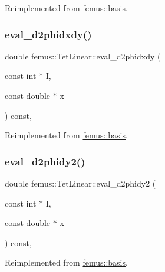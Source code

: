 Reimplemented from \mbox{\hyperlink{classfemus_1_1basis_a0a9839e75d1c9c8302486fc072eed028}{femus\+::basis}}.

\mbox{\label{classfemus_1_1_tet_linear_a45330406ce8b3f4ad0651e7ffda5dd82}} 
\subsubsection{\texorpdfstring{eval\+\_\+d2phidxdy()}{eval\_d2phidxdy()}}
{\footnotesize\ttfamily double femus\+::\+Tet\+Linear\+::eval\+\_\+d2phidxdy (\begin{DoxyParamCaption}\item[{const int $\ast$}]{I,  }\item[{const double $\ast$}]{x }\end{DoxyParamCaption}) const\hspace{0.3cm}{\ttfamily [inline]}, {\ttfamily [virtual]}}



Reimplemented from \mbox{\hyperlink{classfemus_1_1basis_ac9feaf9e60421143db2a3708f3c7fa48}{femus\+::basis}}.

\mbox{\label{classfemus_1_1_tet_linear_a7899d462e924de10cb39e0953fe0b68a}} 
\subsubsection{\texorpdfstring{eval\+\_\+d2phidy2()}{eval\_d2phidy2()}}
{\footnotesize\ttfamily double femus\+::\+Tet\+Linear\+::eval\+\_\+d2phidy2 (\begin{DoxyParamCaption}\item[{const int $\ast$}]{I,  }\item[{const double $\ast$}]{x }\end{DoxyParamCaption}) const\hspace{0.3cm}{\ttfamily [inline]}, {\ttfamily [virtual]}}



Reimplemented from \mbox{\hyperlink{classfemus_1_1basis_a0febb29fe4b32213ff8d6d428f7241cd}{femus\+::basis}}.

